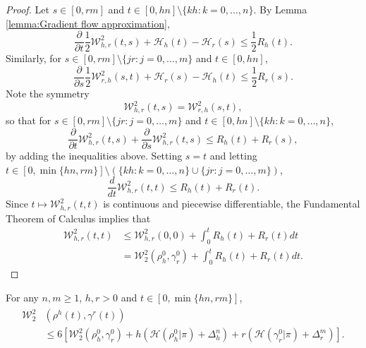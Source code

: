\documentclass[final,12pt]{colt2018}
\newcommand{\was}{\mathcal{W}}
\begin{document}
\begin{proof}
Let $s \in [0,rm]$ and $t\in[0,hn]\setminus \{kh : k = 0,\dots,n\}$. By Lemma \ref{lemma:Gradient flow approximation},
\begin{equation}
\frac{\partial}{\partial t}\frac{1}{2} \was^2_{h, r}(t,s) + \mathcal{H}_{h}(t) - \mathcal{H}_{r}(s) \leq \frac{1}{2}R_{h}(t).
\end{equation}
Similarly, for $s \in [0,rm]\setminus\{jr : j = 0,\dots,m\}$ and $t\in[0,hn]$,
\begin{equation}
\frac{\partial}{\partial s} \frac{1}{2} \was^2_{r, h}(s,t) + \mathcal{H}_{r}(s) - \mathcal{H}_{h}(t) \leq \frac{1}{2} R_{r}(s).
\end{equation}
Note the symmetry
\begin{equation}
\was^2_{h, r}(t,s) = \was^2_{r, h}(s,t),
\end{equation}
so that for $s \in [0,rm]\setminus \{jr : j = 0,\dots,m\}$ and $t\in[0,hn]\setminus\{kh : k = 0,\dots,n\}$,
\begin{equation}
\frac{\partial}{\partial t} \was^2_{h, r}(t,s) + \frac{\partial}{\partial s} \was^2_{h, r}(t,s) \leq R_{h}(t) +  R_{r}(s),
\end{equation}
by adding the inequalities above. Setting $s = t$ and letting $t \in [0,\min\{hn,rm\}]\setminus (\{kh : k = 0,\dots,n\}\cup\{jr : j = 0,\dots,m\})$,
\begin{equation}
\frac{d}{dt} \was^2_{h, r}(t,t) \leq R_{h}(t) +  R_{r}(t).
\end{equation}
Since $t \mapsto \was^2_{h, r}(t,t)$ is continuous and piecewise differentiable, the Fundamental Theorem of Calculus implies that
\begin{align}
\was^2_{h, r}(t,t) &\leq \was^2_{h, r}(0,0) + \int_0^t R_{h}(t) +  R_{r}(t) dt \\
& =  \was_2^2(\rho_{h}^0, \gamma_{r}^0) +  \int_0^t R_{h}(t) +  R_{r}(t) dt.
\end{align}
\end{proof}



\begin{lemma}\label{lemma:bound_wasserstein_two_discretizations}
For any $n, m \geq 1$, $h, r >0$ and $t \in [0,\min\{hn,rm\}]$,
\begin{align}
\begin{split}
\was^2_2 &(\rho^{h}(t), \gamma^{r}(t)) \\
& \leq 6\left[\was_2^2(\rho_{h}^0, \gamma_{r}^0) + {h}\left(\mathcal{H}(\rho_{h}^{0} | \pi) + \Delta_{h}^{n}\right) + {r}\left(\mathcal{H}(\gamma_{r}^{0} | \pi) + \Delta_{r}^{m}\right)  \right].
\end{split}
\end{align}
\end{lemma}
\end{document}
